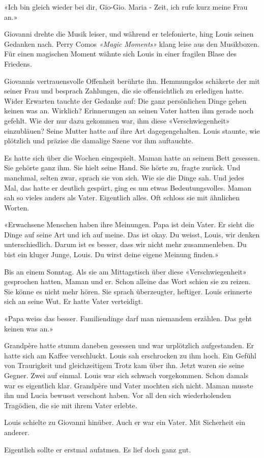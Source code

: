«Ich bin gleich wieder bei dir, Gio-Gio. Maria - Zeit, ich rufe kurz meine Frau an.»

Giovanni drehte die Musik leiser, und während er telefonierte, hing Louis seinen Gedanken nach. Perry Comos \emph{«Magic Moments»} klang leise aus den Musikboxen. Für einen magischen Moment wähnte sich Louis in einer fragilen Blase des Friedens.


Giovannis vertrauensvolle Offenheit berührte ihn. Hemmungslos schäkerte der mit seiner Frau und besprach Zahlungen, die sie offensichtlich zu erledigen hatte. Wider Erwarten tauchte der Gedanke auf: Die ganz persönlichen Dinge gehen keinen was an. Wirklich? Erinnerungen an seinen Vater hatten ihm gerade noch gefehlt. 
Wie der nur dazu gekommen war, ihm diese «Verschwiegenheit» einzubläuen? Seine Mutter hatte auf ihre Art dagegengehalten. 
Louis staunte, wie plötzlich und präzise die damalige Szene vor ihm auftauchte. 

Es hatte sich über die Wochen eingespielt. 
Maman hatte an seinem Bett gesessen. Sie gehörte ganz ihm. Sie hielt seine Hand. 
Sie hörte zu, fragte zurück. Und manchmal, selten zwar, sprach sie von sich. Wie
sie die Dinge sah. Und jedes Mal, das hatte er deutlich gespürt, ging es
um etwas Bedeutungsvolles. Maman sah so vieles anders als Vater.
Eigentlich alles. Oft schloss sie mit ähnlichen Worten.

«Erwachsene Menschen haben ihre Meinungen. Papa ist dein Vater. Er sieht
die Dinge auf seine Art und ich auf meine. Das ist okay. Du weisst,
Louis, wir denken unterschiedlich. Darum ist es besser, dass wir nicht
mehr zusammenleben. Du bist ein kluger Junge, Louis. Du wirst deine
eigene Meinung finden.»

Bis an einem Sonntag. Als sie am Mittagstisch über diese
«Verschwiegenheit» gesprochen hatten, Maman und er. Schon alleine das
Wort schien sie zu reizen. Sie könne es nicht mehr hören. Sie sprach
überzeugter, heftiger. 
Louis erinnerte sich an seine Wut. Er hatte Vater verteidigt.

«Papa weiss das besser. Familiendinge darf man niemandem erzählen. Das
geht keinen was an.»

Grandpère hatte stumm daneben gesessen und war urplötzlich aufgestanden. Er
hatte sich am Kaffee verschluckt. Louis sah erschrocken zu ihm hoch. Ein
Gefühl von Traurigkeit und gleichzeitigem Trotz kam über ihn. Jetzt
waren sie seine Gegner. Zwei auf einmal. Louis war sich schwach
vorgekommen. Schon damals war es eigentlich klar. Grandpère und Vater mochten sich
nicht. Maman musste ihn und Lucia bewusst verschont haben. Vor all den
sich wiederholenden Tragödien, die sie mit ihrem Vater erlebte.

\sectionbreak

Louis schielte zu Giovanni hinüber. Auch er war ein Vater. Mit
Sicherheit ein anderer. 

Eigentlich sollte er erstmal aufatmen. Es lief doch ganz gut. 




